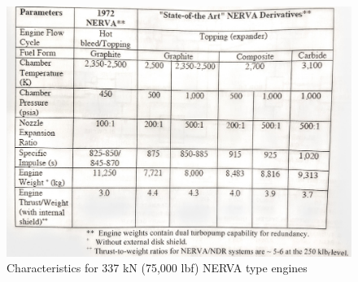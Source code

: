 \documentclass{article}
\begin{document}
\begin{figure}[H]
	\centering
	\includegraphics[height=0.45\textheight]{fig/appY}
	\caption[Characteristics for 337 kN (75,000 lbf) NERVA type engines]{Characteristics for 337 kN (75,000 lbf) NERVA type engines~\cite{borowski1994rationale}}
	\label{appY}
\end{figure}
\end{document}

